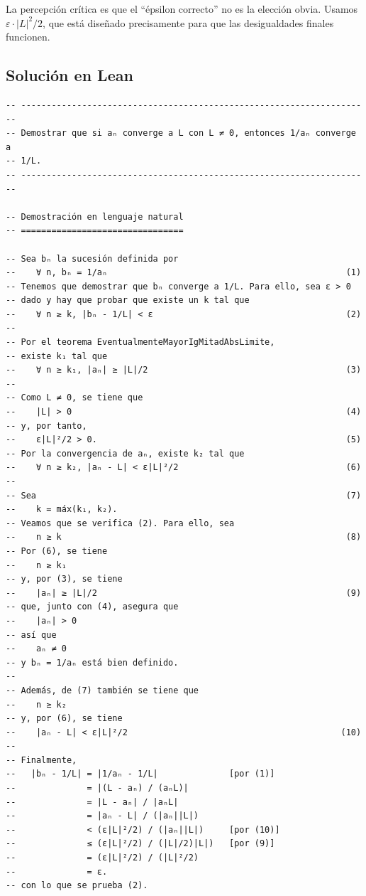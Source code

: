 La percepción crítica es que el ``épsilon correcto'' no es la elección
obvia. Usamos $\varepsilon \cdot |L|^2 / 2$, que está diseñado
precisamente para que las desigualdades finales funcionen.

\subsection{Solución en Lean}

\begin{verbatim}
-- ---------------------------------------------------------------------
-- Demostrar que si aₙ converge a L con L ≠ 0, entonces 1/aₙ converge a
-- 1/L.
-- ---------------------------------------------------------------------

-- Demostración en lenguaje natural
-- ================================

-- Sea bₙ la sucesión definida por
--    ∀ n, bₙ = 1/aₙ                                               (1)
-- Tenemos que demostrar que bₙ converge a 1/L. Para ello, sea ε > 0
-- dado y hay que probar que existe un k tal que
--    ∀ n ≥ k, |bₙ - 1/L| < ε                                      (2)
--
-- Por el teorema EventualmenteMayorIgMitadAbsLimite,
-- existe k₁ tal que
--    ∀ n ≥ k₁, |aₙ| ≥ |L|/2                                       (3)
--
-- Como L ≠ 0, se tiene que
--    |L| > 0                                                      (4)
-- y, por tanto,
--    ε|L|²/2 > 0.                                                 (5)
-- Por la convergencia de aₙ, existe k₂ tal que
--    ∀ n ≥ k₂, |aₙ - L| < ε|L|²/2                                 (6)
--
-- Sea                                                             (7)
--    k = máx(k₁, k₂).
-- Veamos que se verifica (2). Para ello, sea
--    n ≥ k                                                        (8)
-- Por (6), se tiene
--    n ≥ k₁
-- y, por (3), se tiene
--    |aₙ| ≥ |L|/2                                                 (9)
-- que, junto con (4), asegura que
--    |aₙ| > 0
-- así que
--    aₙ ≠ 0
-- y bₙ = 1/aₙ está bien definido.
--
-- Además, de (7) también se tiene que
--    n ≥ k₂
-- y, por (6), se tiene
--    |aₙ - L| < ε|L|²/2                                          (10)
--
-- Finalmente,
--   |bₙ - 1/L| = |1/aₙ - 1/L|              [por (1)]
--              = |(L - aₙ) / (aₙL)|
--              = |L - aₙ| / |aₙL|
--              = |aₙ - L| / (|aₙ||L|)
--              < (ε|L|²/2) / (|aₙ||L|)     [por (10)]
--              ≤ (ε|L|²/2) / (|L|/2)|L|)   [por (9)]
--              = (ε|L|²/2) / (|L|²/2)
--              = ε.
-- con lo que se prueba (2).


\end{verbatim}
